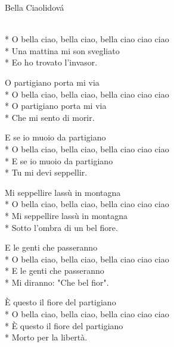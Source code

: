 \documentclass[10.5pt]{book}
\begin{document}
\begin{poem}{Bella Ciao}{lidová}

\settowidth{\versewidth}{O bella ciao, bella ciao, bella ciao ciao ciao}

\\*
O bella ciao, bella ciao, bella ciao ciao ciao\\*
Una mattina mi son svegliato\\*
Eo ho trovato l'invasor.

O partigiano porta mi via\\*
O bella ciao, bella ciao, bella ciao ciao ciao\\*
O partigiano porta mi via\\*
Che mi sento di morir.

E se io muoio da partigiano\\*
O bella ciao, bella ciao, bella ciao ciao ciao\\*
E se io muoio da partigiano\\*
Tu mi devi seppellir.

Mi seppellire lassù in montagna\\*
O bella ciao, bella ciao, bella ciao ciao ciao\\*
Mi seppellire lassù in montagna\\*
Sotto l'ombra di un bel fiore.

E le genti che passeranno\\*
O bella ciao, bella ciao, bella ciao ciao ciao\\*
E le genti che passeranno\\*
Mi diranno: "Che bel fior".

È questo il fiore del partigiano\\*
O bella ciao, bella ciao, bella ciao ciao ciao\\*
È questo il fiore del partigiano\\*
Morto per la libertà.

\end{poem}
\end{document}
